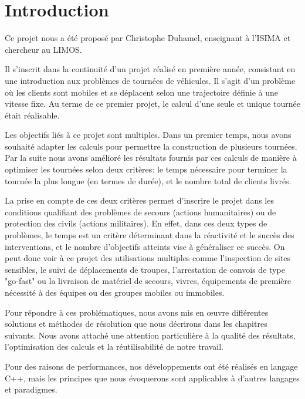 \chapter*{Introduction}

Ce projet nous a été proposé par Christophe Duhamel, enseignant à l’ISIMA et chercheur au LIMOS.

Il s'inscrit dans la continuité d'un projet réalisé en première année, consistant en une introduction aux problèmes de tournées de véhicules.
Il s'agit d'un problème où les clients sont mobiles et se déplacent selon une trajectoire définie à une vitesse fixe. Au terme de ce premier projet, le calcul d'une seule et unique tournée était réalisable.

Les objectifs liés à ce projet sont multiples. Dans un premier temps, nous avons souhaité adapter les calculs pour permettre la construction de plusieurs tournées. Par la suite nous avons amélioré les résultats fournis par ces calculs de manière à optimiser les tournées selon deux critères: le temps nécessaire pour terminer la tournée la plus longue (en termes de durée), et le nombre total de clients livrés.

La prise en compte de ces deux critères permet d'inscrire le projet dans les conditions qualifiant des problèmes de secours (actions humanitaires) ou de protection des civils (actions militaires). En effet, dans ces deux types de problèmes, le temps est un critère déterminant dans la réactivité et le succès des interventions, et le nombre d'objectifs atteints vise à généraliser ce succès. On peut donc voir à ce projet des utilisations multiples comme l'inspection de sites sensibles, le suivi de déplacements de troupes, l'arrestation de convois de type "go-fast" ou la livraison de matériel de secours, vivres, équipements de première nécessité à des équipes ou des groupes mobiles ou immobiles.

Pour répondre à ces problématiques, nous avons mis en \oe uvre différentes solutions et méthodes de résolution que nous décrirons dans les chapitres suivants. Nous avons attaché une attention particulière à la qualité des résultats, l'optimisation des calculs et la réutilisabilité de notre travail.

Pour des raisons de performances, nos développements ont été réalisés en langage C++, mais les principes que nous évoquerons sont applicables à d'autres langages et paradigmes.